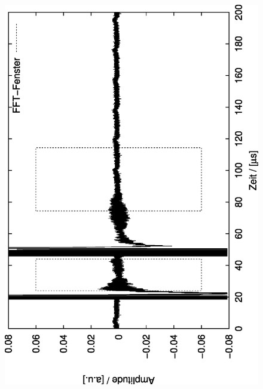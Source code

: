  \begin{figure}[htp]
	\begin{center}
		\includegraphics[angle=-90,width=\bigwidth]{plots/t2_auswert_shots_1}


\end{center}
\end{figure}
